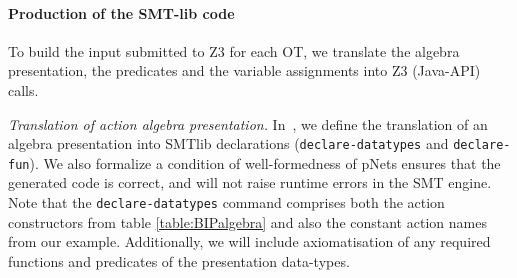 \documentclass[smallcondensed]{svjour3}
\newcommand{\noteSB}[2][color=green!40, size=\tiny]{\todo[#1]{{\bf
      Note: } {#2}}}
\begin{document}

\paragraph{Production of the SMT-lib code}
  To build the input submitted to Z3 for each OT,
we translate the algebra presentation, the predicates and the
variable assignments into Z3 (Java-API) calls.

\emph{Translation of action algebra presentation.}
In~\cite{Avocs-RR}, we  define the translation of an algebra presentation into
SMTlib declarations (\texttt{declare-datatypes} and
\texttt{declare-fun}). We also formalize a condition of well-formedness of pNets ensures that the generated code is correct,
and will not raise runtime errors in the SMT engine. Note that the
\texttt{declare-datatypes} command comprises both the action
constructors from table \ref{table:BIPalgebra} and also the constant action
names from our example.
Additionally, we will include axiomatisation of any required functions
and predicates of the presentation data-types.


\end{document}
